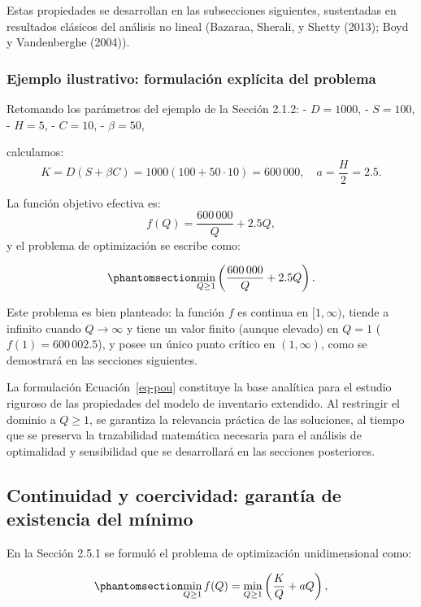\documentclass[
  spanish,
  us-letterpaper,
  DIV=11,
  numbers=noendperiod]{scrreprt}
\numberwithin{equation}{section}
\begin{document}
Estas propiedades se desarrollan en las subsecciones siguientes,
sustentadas en resultados clásicos del análisis no lineal (Bazaraa,
Sherali, y Shetty (2013); Boyd y Vandenberghe (2004)).

\subsubsection{Ejemplo ilustrativo: formulación explícita del
problema}\label{ejemplo-ilustrativo-formulaciuxf3n-expluxedcita-del-problema}

Retomando los parámetros del ejemplo de la Sección 2.1.2: -
\(D = 1000\), - \(S = 100\), - \(H = 5\), - \(C = 10\), -
\(\beta = 50\),

calculamos: \[
K = D(S + \beta C) = 1000(100 + 50 \cdot 10) = 600\,000, \quad
a = \frac{H}{2} = 2.5.
\]

La función objetivo efectiva es: \[
f(Q) = \frac{600\,000}{Q} + 2.5 Q,
\] y el problema de optimización se escribe como:

\begin{equation}\phantomsection\label{eq-po}{
\min_{Q \geq 1} \left( \frac{600\,000}{Q} + 2.5 Q \right).
}\end{equation}

Este problema es bien planteado: la función \(f\) es continua en
\([1, \infty)\), tiende a infinito cuando \(Q \to \infty\) y tiene un
valor finito (aunque elevado) en \(Q=1\) (\(f(1) = 600\,002.5\)), y
posee un único punto crítico en \((1, \infty)\), como se demostrará en
las secciones siguientes.

La formulación Ecuación~\ref{eq-pou} constituye la base analítica para
el estudio riguroso de las propiedades del modelo de inventario
extendido. Al restringir el dominio a \(Q \geq 1\), se garantiza la
relevancia práctica de las soluciones, al tiempo que se preserva la
trazabilidad matemática necesaria para el análisis de optimalidad y
sensibilidad que se desarrollará en las secciones posteriores.

\subsection{Continuidad y coercividad: garantía de existencia del
mínimo}\label{continuidad-y-coercividad-garantuxeda-de-existencia-del-muxednimo}

En la Sección 2.5.1 se formuló el problema de optimización
unidimensional como:

\begin{equation}\phantomsection\label{eq-prob_25_1}{
\min_{Q \geq 1} f(Q) = \min_{Q \geq 1} \left( \frac{K}{Q} + a Q \right),
}\end{equation}
\end{document}
